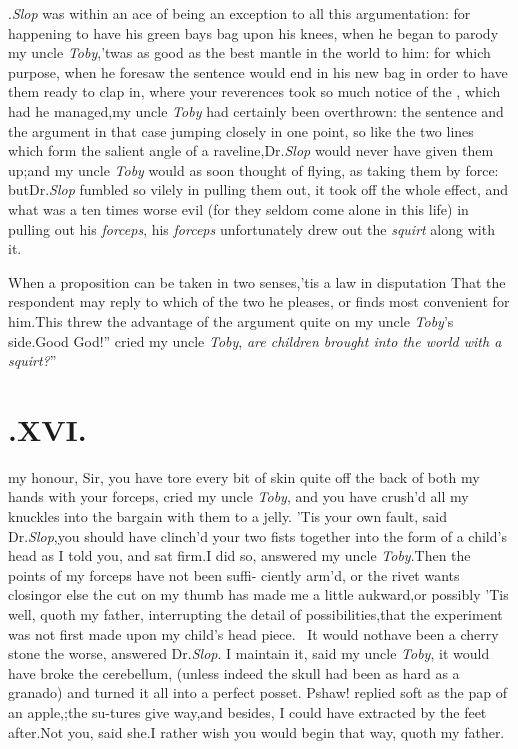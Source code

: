 \documentclass{article}
\begin{document}
.\@ \textit{Slop} was within an ace of
being an exception to all this argumentation: for happening to have
his green bays bag upon his knees, when he began to parody my
uncle \textit{Toby},\tsk ’twas as good as the best mantle in
the world to him: for which purpose, when he foresaw the sentence
would end in his new
\break
bag in order to have them ready to clap in, where your reverences
took so much notice of the \astvi, which had he
managed,\tsk my uncle \textit{Toby} had cert\-ain\-ly been
overthrown: the sentence and the argument in that case jumping
closely in one point, so like the two lines which form the salient
angle of a raveline,\tsk Dr.\@ \textit{Slop} would never have
given them up;\tsh\break and my uncle \textit{Toby} would as soon
thought of flying, as taking them by force: but\break Dr.\@ \textit{Slop} fumbled so vilely in
pulling them out, it took off the whole effect, and what was a ten
times worse evil (for they seldom come alone in this life) in
pulling out his \textit{forceps}, his \textit{forceps} unfortunately
drew out the \textit{squirt} along with it.

When a proposition can be taken in two senses,\tsh ’tis a
law in disputation That the respondent may reply to which
of the two he pleases, or finds most convenient for him.\tsh This
threw the advantage of the argument quite on my uncle
\textit{Toby}’s side.\tsk\lqq Good God!”
cried my uncle \textit{Toby}, \lqq\textit{are children brought into the
world with a squirt?}”

\section{.\quad  XVI.}

 my honour, Sir, you have tore
every bit of skin quite off the back of both my hands with your
forceps, cried my uncle \textit{Toby},\tsk\break
and you have crush’d all my knuckles into the bargain with them to a jelly. ’Tis your
own fault, said Dr.\@ \textit{Slop},\tsh you should have
clinch’d your two fists together into the form of a child’s head
as I told you, and sat firm.\tsh I did so, answered my uncle
\textit{Toby}.\tsh Then the points of my forceps have not been
suffi- ciently arm’d, or the rivet wants
closing\break\tsk or else
the cut on my thumb has made me a little aukward,\tsk or
possibly\tsk\break
’Tis well, quoth my father, interrupting the detail
of possibilities,\tsk that the ex\-periment was not first made upon
my child’s head piece. \tsh\, It would not\break have been a cherry stone
the worse, answered Dr.\@ \textit{Slop}. I maintain it, said
my uncle \textit{Toby}, it would have broke the ce\-rebellum,
(unless indeed the skull had been as hard as a granado) and
turned it all into a perfect posset. Pshaw! replied  soft as the pap of
an apple,;\tsh the su-\break tures give way,\tsk and besides, I could have
extracted by the feet after.\tsk Not you, said she.\tsk I rather
wish you would begin that way, quoth my father.
\end{document}
